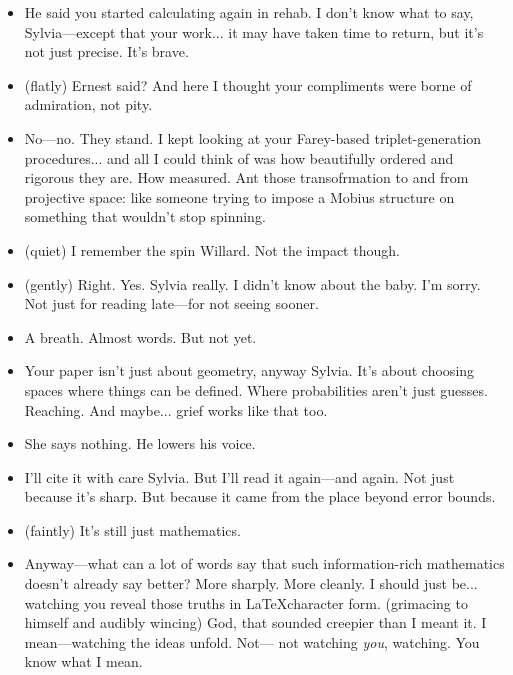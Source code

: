 \begin{itemize}[leftmargin=2cm, label={}]
\item[\textbf{Willard:}]  
He said you started calculating again in rehab.  
I don’t know what to say, Sylvia—except that your work... it may have taken time to return, but it’s not just precise. It’s brave.

\item[\textbf{Sylvia :}]  
(flatly) Ernest said?  
And here I thought your compliments were borne of admiration, not pity.

\item[\textbf{Willard:}]  
No—no. They stand.  
I kept looking at your Farey-based triplet-generation procedures... and all I could think of was how beautifully ordered and rigorous they are. How measured. Ant those transofrmation to and from projective space:  
like someone trying to impose a Mobius structure on something that wouldn’t stop spinning.

\item[\textbf{Sylvia:}]  (quiet)
I remember the spin Willard. Not the impact though.

\item[\textbf{Willard :}]  
(gently) Right. Yes.  
Sylvia really. I didn’t know about the baby.  
I’m sorry. Not just for reading late—for not seeing sooner.

\item[] A breath. Almost words. But not yet.

\item[\textbf{Willard:}]  
Your paper isn’t just about geometry, anyway Sylvia.  
It’s about choosing spaces where things can be defined.  
Where probabilities aren’t just guesses. Reaching.  
And maybe... grief works like that too.

\item[] She says nothing. He lowers his voice.

\item[\textbf{Willard:}]  
I’ll cite it with care Sylvia.  
But I’ll read it again—and again.  
Not just because it’s sharp. But because it came from the place beyond error bounds.

\item[\textbf{Sylvia :}] (faintly) 
It’s still just mathematics.

\item[\textbf{Willard:}]  
Anyway—what can a lot of words say  
that such information-rich mathematics doesn’t already say better?  
More sharply. More cleanly. I should just be... watching you reveal those truths  in \LaTeX character form.
(grimacing to himself and audibly wincing)
God, that sounded creepier than I meant it.  
I mean—watching the ideas unfold. Not—  
not watching \textit{you}, watching.  
You know what I mean.


\end{itemize}
